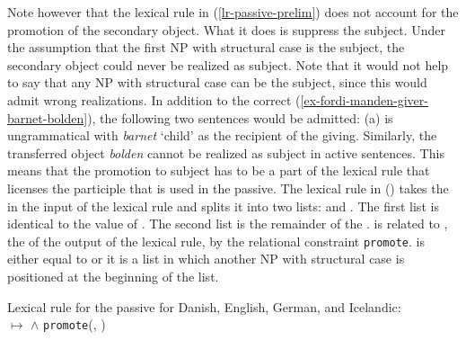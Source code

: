 Note however that the lexical rule in (\ref{lr-passive-prelim}) does not account for the promotion
of the secondary object. What it does is suppress the subject. Under the assumption that the
first NP with structural case is the subject, the secondary object could never be realized as
subject. Note that it would not help to say that any NP with structural case can be the subject, since
this would admit wrong realizations. In addition to the correct
(\ref{ex-fordi-manden-giver-barnet-bolden}), the following two sentences would be admitted: 
\eal
{}
\zl
(a) is ungrammatical with \emph{barnet} `child' as the recipient of the giving. Similarly, the
transferred object \emph{bolden} cannot be realized as subject in active sentences. This means that
the promotion to subject has to be a part of the lexical  rule that licenses the participle that is
used in the passive. The lexical rule in () takes the \argstl in the input of the lexical rule and splits it into two
lists:  and . The first list  is identical to the value of \da. The second list  is the
remainder of the \argstl.  is related to , the \argstv of the output of the lexical rule, by the relational constraint
\texttt{promote}.  is either equal to  or it is a list in which another NP with
structural case is positioned at the beginning of the list.

\eas
\label{lr-passive-double-object}
Lexical rule for the passive for Danish, English, German, and Icelandic:\\
 $\mapsto$
 $\wedge$ \texttt{promote}(, )
\zs

